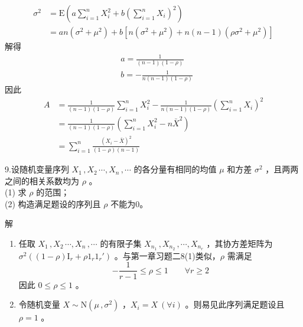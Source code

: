 \documentclass[12pt,hyperref,]{ctexart}
\begin{document}
\begin{equation*}
\begin{aligned}
\sigma^2 &= \mathrm{E}\left(a\sum_{i=1}^nX_i^2+b\left(\sum_{i=1}^nX_i\right)^2\right) \\
&= an(\sigma^2+\mu^2)+b[n(\sigma^2+\mu^2)+n(n-1)(\rho\sigma^2+\mu^2)]
\end{aligned}
\end{equation*}解得 \begin{equation*}
\begin{aligned}
& a=\frac{1}{(n-1)(1-\rho)} \\
& b=-\frac{1}{n(n-1)(1-\rho)}
\end{aligned}
\end{equation*}因此 \begin{equation*}
\begin{aligned}
A &= \frac{1}{(n-1)(1-\rho)}\sum_{i=1}^nX_i^2-\frac{1}{n(n-1)(1-\rho)}\left(\sum_{i=1}^nX_i\right)^2 \\
&= \frac{1}{(n-1)(1-\rho)}\left(\sum_{i=1}^nX_i^2-n\bar{X}^2\right) \\
&= \sum_{i=1}^n\frac{(X_i-\bar{X})^2}{(1-\rho)(n-1)}
\end{aligned}
\end{equation*}

\vspace{3em}

\kaishu

9.设随机变量序列 \(X_1\, ,X_2\, \cdots ,X_n\, ,\cdots\)
的各分量有相同的均值 \(\mu\) 和方差 \(\sigma^2\)
，且两两之间的相关系数均为 \(\rho\) 。\\
(1) 求 \(\rho\) 的范围；\\
(2) 构造满足题设的序列且 \(\rho\) 不能为0。

\vspace{1em}

\heiti

解

\songti

\begin{enumerate}
\def\labelenumi{(\arabic{enumi})}
\item
  任取 \(X_1\, ,X_2\, \cdots ,X_n\, ,\cdots\) 的有限子集
  \(X_{n_1}\, ,X_{n_2}\, ,\cdots ,X_{n_r}\) ，其协方差矩阵为
  \(\sigma^2((1-\rho)\mathrm{I}_r+\rho 1_r1_r')\)
  。与第一章习题二8(1)类似，\(\rho\) 需满足 \begin{equation*}
  -\frac{1}{r-1}\le \rho\le 1 \qquad \forall r\ge 2
  \end{equation*}因此 \(0\le \rho\le1\) 。
\item
  令随机变量 \(X\sim\mathrm{N}(\mu\, ,\sigma^2)\)
  ，\(X_i=X\ (\forall i)\) 。则易见此序列满足题设且 \(\rho=1\) 。
\end{enumerate}
\end{document}
